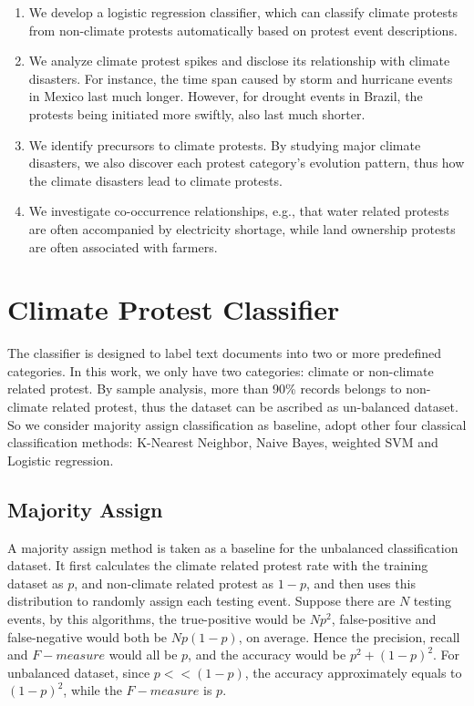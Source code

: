 \begin{enumerate}
  \item We develop a logistic regression classifier, which can classify climate protests from non-climate protests automatically based on protest event descriptions.
  \item We analyze climate protest spikes and disclose its relationship with climate disasters. For instance, the time span caused by storm and hurricane events in Mexico last much longer. However, for drought events in Brazil, the protests being initiated more swiftly, also last much shorter.
  \item We identify precursors to
climate protests. By studying major climate disasters, we also discover each protest category's evolution pattern, thus how the climate disasters lead to climate protests.
  \item We investigate co-occurrence relationships, e.g.,
that
water related protests are often accompanied by electricity shortage, while land ownership protests are often associated with farmers.
\end{enumerate}
%

\section{Climate Protest Classifier}
The classifier is designed to label text documents into two or more predefined categories. In this work, we only have two categories: climate or non-climate related protest. By sample analysis, more than 90\% records belongs to non-climate related protest, thus the dataset can be ascribed as un-balanced dataset. So we consider majority assign classification as baseline, adopt other four classical classification methods: K-Nearest Neighbor, Naive Bayes, weighted SVM and Logistic regression.

\subsection{Majority Assign}
A majority assign method is taken as a baseline for the unbalanced classification dataset. It first calculates the climate related protest rate with the training dataset as $p$, and non-climate related protest as $1-p$, and then uses this distribution to randomly assign each testing event. Suppose there are $N$ testing events, by this algorithms, the true-positive would be $Np^2$, false-positive and false-negative would both be $Np(1-p)$, on average. Hence the precision, recall and $F-measure$ would all be $p$, and the accuracy would be $p^2+(1-p)^2$. For unbalanced dataset, since $p<<(1-p)$, the accuracy approximately equals to $(1-p)^2$, while the $F-measure$ is $p$.


